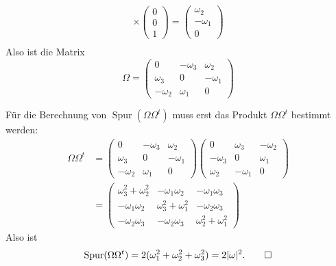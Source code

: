 \begin{loesung}
\begin{teilaufgaben}
\begin{align*}
\times
\begin{pmatrix}0\\0\\1\end{pmatrix}
=
\begin{pmatrix}\omega_2\\-\omega_1\\0\end{pmatrix}
\\
\end{align*}
Also ist die Matrix
\[
\Omega=\begin{pmatrix}
0&-\omega_3&\omega_2\\
\omega_3&0&-\omega_1\\
-\omega_2&\omega_1&0
\end{pmatrix}
\]
\item
Für die Berechnung von $\operatorname{Spur}(\Omega\Omega^t)$ muss erst
das Produkt $\Omega\Omega^t$ bestimmt werden:
\begin{align*}
\Omega\Omega^t
&=
\begin{pmatrix}
0&-\omega_3&\omega_2\\
\omega_3&0&-\omega_1\\
-\omega_2&\omega_1&0
\end{pmatrix}
\begin{pmatrix}
0&\omega_3&-\omega_2\\
-\omega_3&0&\omega_1\\
\omega_2&-\omega_1&0
\end{pmatrix}
\\
&=
\begin{pmatrix}
\omega_3^2+\omega_2^2&-\omega_1\omega_2&-\omega_1\omega_3\\
-\omega_1\omega_2&\omega_3^2+\omega_1^2&-\omega_2\omega_3\\
-\omega_2\omega_3&-\omega_2\omega_3&\omega_2^2+\omega_1^2
\end{pmatrix}
\end{align*}
Also ist
\[
\operatorname{Spur}(\Omega\Omega^t)
=
2(\omega_1^2+\omega_2^2+\omega_3^2)=2|\omega|^2.
\qedhere
\]
\end{teilaufgaben}
\end{loesung}

